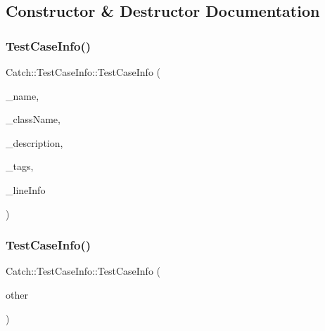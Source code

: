 \subsection{Constructor \& Destructor Documentation}
\mbox{\label{struct_catch_1_1_test_case_info_a35ec65315e0d1f178491b5a59f3f3123}} 
\subsubsection{\texorpdfstring{Test\+Case\+Info()}{TestCaseInfo()}\hspace{0.1cm}{\footnotesize\ttfamily [1/2]}}
{\footnotesize\ttfamily Catch\+::\+Test\+Case\+Info\+::\+Test\+Case\+Info (\begin{DoxyParamCaption}\item[{std\+::string const \&}]{\+\_\+name,  }\item[{std\+::string const \&}]{\+\_\+class\+Name,  }\item[{std\+::string const \&}]{\+\_\+description,  }\item[{std\+::set$<$ std\+::string $>$ const \&}]{\+\_\+tags,  }\item[{\mbox{\hyperlink{struct_catch_1_1_source_line_info}{Source\+Line\+Info}} const \&}]{\+\_\+line\+Info }\end{DoxyParamCaption})}

\mbox{\label{struct_catch_1_1_test_case_info_ac338adb4e38f4bf3977fb45b2b1fe447}} 
\subsubsection{\texorpdfstring{Test\+Case\+Info()}{TestCaseInfo()}\hspace{0.1cm}{\footnotesize\ttfamily [2/2]}}
{\footnotesize\ttfamily Catch\+::\+Test\+Case\+Info\+::\+Test\+Case\+Info (\begin{DoxyParamCaption}\item[{\mbox{\hyperlink{struct_catch_1_1_test_case_info}{Test\+Case\+Info}} const \&}]{other }\end{DoxyParamCaption})}



